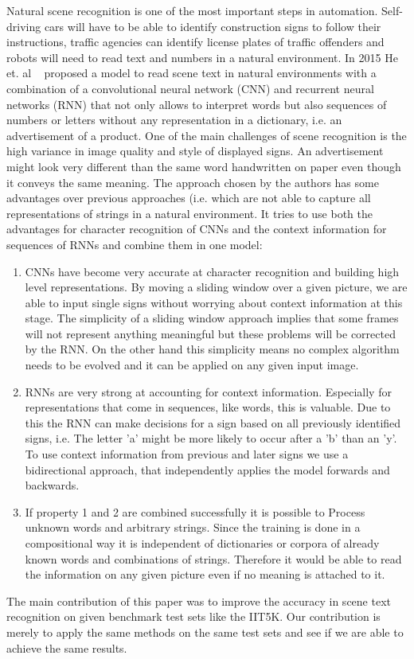 \documentclass{utue} %
\begin{document}
Natural scene recognition is one of the most important steps in automation. Self-driving cars will have to be able to identify construction signs to follow their instructions, traffic agencies can identify license plates of traffic offenders %
and robots will need to read text and numbers in a natural environment. In 2015 He et. al ~\cite{2015arXiv150604395H} proposed a model to read scene text in natural environments with a combination of a convolutional neural network (CNN) and recurrent neural networks (RNN) that not only allows to interpret words but also sequences of numbers or letters without any representation in a dictionary, i.e. an advertisement of a product. One of the main challenges of scene recognition is the high variance in image quality and style of displayed signs. An advertisement might look very different than the same word handwritten on paper even though it conveys the same meaning. The approach chosen by the authors has some advantages over previous approaches (i.e. %
which are not able to capture all representations of strings in a natural environment. It tries to use both the advantages for character recognition of CNNs and the context information for sequences of RNNs and combine them in one model: \\
\begin{enumerate}
	\item CNNs have become very accurate at character recognition and building high level representations. 
	By moving a sliding window over a given picture, we are able to input single signs without worrying about context information at this stage. The simplicity of a sliding window approach implies that some frames will not represent anything meaningful but these problems will be corrected by the RNN. On the other hand this simplicity means no complex algorithm needs to be evolved and it can be applied on any given input image.
	\item RNNs are very strong at accounting for context information.
	Especially for representations that come in sequences, like words, this is valuable. Due to this the RNN can make decisions for a sign based on all previously identified signs, i.e. The letter 'a' might be more likely to occur after a 'b' than an 'y'. To use context information from previous and later signs we use a bidirectional approach, that independently applies the model forwards and backwards. 
	\item If property 1 and 2 are combined successfully it is possible to Process unknown words and arbitrary strings. Since the training is done in a compositional way it is independent of dictionaries or corpora of already known words and combinations of strings. Therefore it would be able to read the information on any given picture even if no meaning is attached to it. 
\end{enumerate}
The main contribution of this paper was to improve the accuracy in scene text recognition on given benchmark test sets like the IIT5K. Our contribution is merely to apply the same methods on the same test sets and see if we are able to achieve the same results. 
\end{document}
